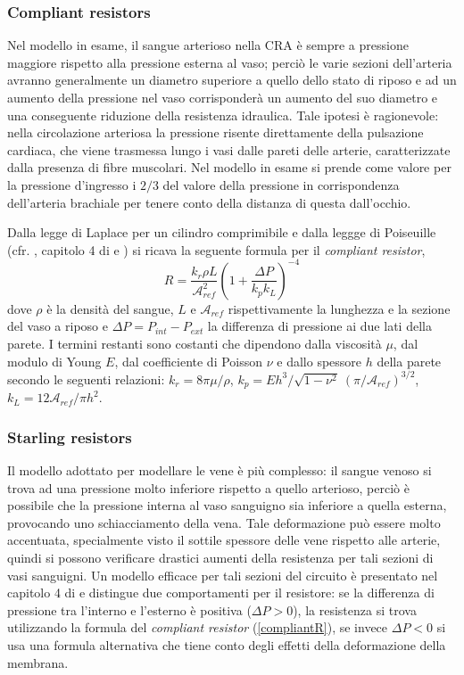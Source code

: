 \documentclass{article}
\begin{document}
\subsubsection*{Compliant resistors}
Nel modello in esame, il sangue arterioso nella CRA è sempre a pressione maggiore rispetto alla pressione esterna al vaso; perciò le varie sezioni dell'arteria avranno generalmente un diametro superiore a quello dello stato di riposo e ad un aumento della pressione nel vaso corrisponderà un aumento del suo diametro e una conseguente riduzione della resistenza idraulica.
Tale ipotesi è ragionevole: nella circolazione arteriosa la pressione risente direttamente della pulsazione cardiaca, che viene trasmessa lungo i vasi dalle pareti delle arterie, caratterizzate dalla presenza di fibre muscolari.
Nel modello in esame si prende come valore per la pressione d'ingresso  i $2/3$ del valore della pressione in corrispondenza dell'arteria brachiale per tenere conto della distanza di questa dall'occhio.

Dalla legge di Laplace per un cilindro comprimibile e dalla leggge di Poiseuille (cfr. \cite{art1}, capitolo 4 di \cite{notes} e \cite{Libro}) si ricava la seguente formula per il \textit{compliant resistor},
\begin{equation}
R = \frac{k_r \rho L}{\mathcal{A}_{ref}^2}\left( 1 + \frac{\Delta P}{k_p k_L}\right)^{-4}
\label{compliantR}
\end{equation}
dove $\rho$ è la densità del sangue, $L$ e $\mathcal{A}_{ref}$ rispettivamente la lunghezza e la sezione del vaso a riposo e $\Delta P = P_{int} - P_{ext}$ la differenza di pressione ai due lati della parete.
I termini restanti sono costanti che dipendono dalla viscosità $\mu$, dal modulo di Young $E$, dal coefficiente di Poisson $\nu$ e dallo spessore $h$ della parete secondo le seguenti relazioni: $k_r = 8 \pi \mu / \rho$, $k_p = E h^3 / \sqrt{1 - \nu^2}\  (\pi/\mathcal{A}_{ref})^{3/2}$, $k_L = 12 \mathcal{A}_{ref} / \pi h^2$.
\subsubsection*{Starling resistors}
Il modello adottato per modellare le vene è più complesso: il sangue venoso si trova ad una pressione molto inferiore rispetto a quello arterioso, perciò è possibile che la pressione interna al vaso sanguigno sia inferiore a quella esterna, provocando uno schiacciamento della vena.
Tale deformazione può essere molto accentuata, specialmente visto il sottile spessore delle vene rispetto alle arterie, quindi si possono verificare drastici aumenti della resistenza per tali sezioni di vasi sanguigni.
Un modello efficace per tali sezioni del circuito è presentato nel capitolo 4 di \cite{notes} e distingue due comportamenti per il resistore: se la differenza di pressione tra l'interno e l'esterno è positiva ($\Delta P > 0$), la resistenza si trova utilizzando la formula del \textit{compliant resistor} (\ref{compliantR}), se invece $\Delta P < 0$ si usa una formula alternativa che tiene conto degli effetti della deformazione della membrana.
\end{document}

